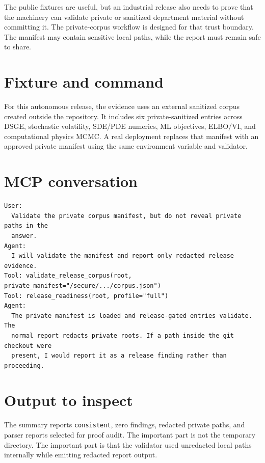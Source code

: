 \documentclass[12pt,a4paper,openany]{book}
\begin{document}
The public fixtures are useful, but an industrial release also needs to prove
that the machinery can validate private or sanitized department material without
committing it. The private-corpus workflow is designed for that trust boundary.
The manifest may contain sensitive local paths, while the report must remain
safe to share.

\section*{Fixture and command}

For this autonomous release, the evidence uses an external sanitized corpus
created outside the repository. It includes six private-sanitized entries across
DSGE, stochastic volatility, SDE/PDE numerics, ML objectives, ELBO/VI, and
computational physics MCMC. A real deployment replaces that manifest with an
approved private manifest using the same environment variable and validator.

\section*{MCP conversation}

\begin{lstlisting}[basicstyle=\ttfamily\scriptsize]
User:
  Validate the private corpus manifest, but do not reveal private paths in the
  answer.
Agent:
  I will validate the manifest and report only redacted release evidence.
Tool: validate_release_corpus(root, private_manifest="/secure/.../corpus.json")
Tool: release_readiness(root, profile="full")
Agent:
  The private manifest is loaded and release-gated entries validate. The
  normal report redacts private roots. If a path inside the git checkout were
  present, I would report it as a release finding rather than proceeding.
\end{lstlisting}



\section*{Output to inspect}

The summary reports \texttt{consistent}, zero findings, redacted private paths,
and parser reports selected for proof audit. The important part is not the
temporary directory. The important part is that the validator used unredacted
local paths internally while emitting redacted report output.
\end{document}
